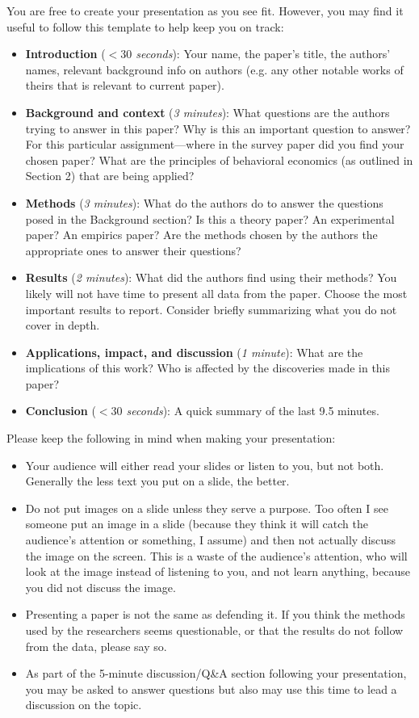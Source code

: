 \documentclass[11pt]{article}
\begin{document}
You are free to create your presentation as you see fit. However, you may find it useful to follow this template to help keep you on track:
\begin{itemize}
    \item {\bf Introduction} ({\it $<30$ seconds}): Your name, the paper's title, the authors' names, relevant background info on authors (e.g. any other notable works of theirs that is relevant to current paper).
    \item {\bf Background and context} ({\it 3 minutes}): What questions are the authors trying to answer in this paper? Why is this an important question to answer? For this particular assignment---where in the survey paper did you find your chosen paper? What are the principles of behavioral economics (as outlined in Section 2) that are being applied?
    \item {\bf Methods} ({\it 3 minutes}): What do the authors do to answer the questions posed in the Background section? Is this a theory paper? An experimental paper? An empirics paper? Are the methods chosen by the authors the appropriate ones to answer their questions? 
    \item {\bf Results} ({\it 2 minutes}): What did the authors find using their methods? You likely will not have time to present all data from the paper. Choose the most important results to report. Consider briefly summarizing what you do not cover in depth.
    \item {\bf Applications, impact, and discussion} ({\it 1 minute}): What are the implications of this work? Who is affected by the discoveries made in this paper?
    \item {\bf Conclusion} ({\it $<30$ seconds}): A quick summary of the last 9.5 minutes.
\end{itemize}

\noindent Please keep the following in mind when making your presentation:

\begin{itemize}
    \item Your audience will either read your slides or listen to you, but not both. Generally the less text you put on a slide, the better. 
    \item Do not put images on a slide unless they serve a purpose. Too often I see someone put an image in a slide (because they think it will catch the audience's attention or something, I assume) and then not actually discuss the image on the screen. This is a waste of the audience's attention, who will look at the image instead of listening to you, and not learn anything, because you did not discuss the image.
    \item Presenting a paper is not the same as defending it. If you think the methods used by the researchers seems questionable, or that the results do not follow from the data, please say so. 
    \item As part of the 5-minute discussion/Q\&A section following your presentation, you may be asked to answer questions but also may use this time to lead a discussion on the topic.
\end{itemize}
\end{document}
